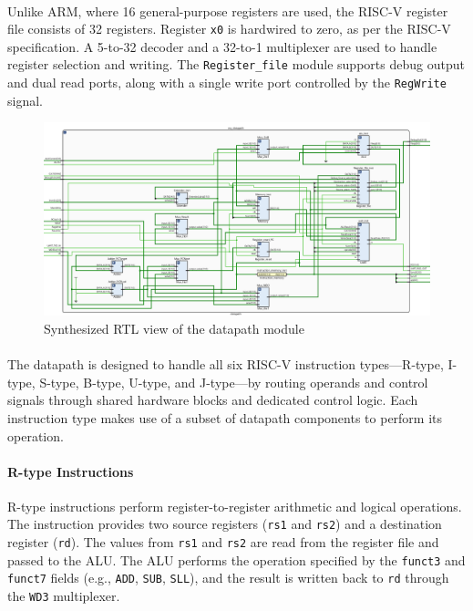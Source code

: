 \documentclass[12pt]{report}
\begin{document}
\paragraph{}
Unlike ARM, where 16 general-purpose registers are used, the RISC-V register file consists of 32 registers. Register \texttt{x0} is hardwired to zero, as per the RISC-V specification. A 5-to-32 decoder and a 32-to-1 multiplexer are used to handle register selection and writing. The \texttt{Register\_file} module supports debug output and dual read ports, along with a single write port controlled by the \texttt{RegWrite} signal.

\begin{figure}[h]
    \centering
    \includegraphics[width=\textwidth]{figures/rtl_datapath.png}
    \caption{Synthesized RTL view of the datapath module}
    \label{fig:datapath_rtl}
\end{figure}

\paragraph{}
The datapath is designed to handle all six RISC-V instruction types—R-type, I-type, S-type, B-type, U-type, and J-type—by routing operands and control signals through shared hardware blocks and dedicated control logic. Each instruction type makes use of a subset of datapath components to perform its operation.

\paragraph{R-type Instructions}
R-type instructions perform register-to-register arithmetic and logical operations. The instruction provides two source registers (\texttt{rs1} and \texttt{rs2}) and a destination register (\texttt{rd}). The values from \texttt{rs1} and \texttt{rs2} are read from the register file and passed to the ALU. The ALU performs the operation specified by the \texttt{funct3} and \texttt{funct7} fields (e.g., \texttt{ADD}, \texttt{SUB}, \texttt{SLL}), and the result is written back to \texttt{rd} through the \texttt{WD3} multiplexer.
\end{document}
